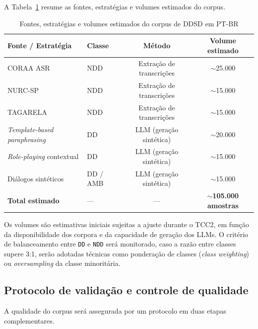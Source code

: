 \documentclass[
    12pt,                %
    openright,           %
    oneside,             %
    a4paper,             %
    english,             %
    brazil               %
]{abntex2}
\begin{document}
A Tabela~\ref{tab:corpus_fontes} resume as fontes, estratégias e volumes estimados do corpus.

\begin{table}[htb]
    \centering
    \caption{Fontes, estratégias e volumes estimados do corpus de DDSD em PT-BR}
    \label{tab:corpus_fontes}
    \begin{tabular}{llcc}
        \toprule
        \textbf{Fonte / Estratégia}
            & \textbf{Classe}
            & \textbf{Método}
            & \textbf{Volume estimado} \\
        \midrule
        CORAA ASR
            & NDD & Extração de transcrições & $\sim$25.000 \\
        NURC-SP 
            & NDD & Extração de transcrições & $\sim$15.000 \\
        TAGARELA 
            & NDD & Extração de transcrições & $\sim$15.000 \\
        \textit{Template-based paraphrasing}
            & DD & LLM (geração sintética) & $\sim$20.000 \\
        \textit{Role-playing} contextual
            & DD & LLM (geração sintética) & $\sim$15.000 \\
        Diálogos sintéticos
            & DD / AMB & LLM (geração sintética) & $\sim$15.000 \\
        \midrule
        \textbf{Total estimado}
            & ---
            & ---
            & \textbf{$\sim$105.000 amostras} \\
        \bottomrule
    \end{tabular}
\end{table}

Os volumes são estimativas iniciais sujeitas a ajuste durante o TCC2, em função da disponibilidade dos corpora e da capacidade de geração dos LLMs. O critério de balanceamento entre \texttt{DD} e \texttt{NDD} será monitorado, caso a razão entre classes supere 3:1, serão adotadas técnicas como ponderação de classes (\textit{class weighting}) ou \textit{oversampling} da classe minoritária.

\subsection{Protocolo de validação e controle de qualidade}
\label{sec:protocolo_anotacao}

A qualidade do corpus será assegurada por um protocolo em duas etapas complementares.
\end{document}
